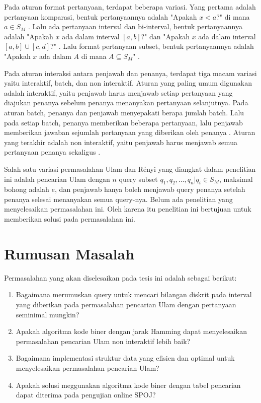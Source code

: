 Pada aturan format pertanyaan, terdapat beberapa variasi. Yang pertama adalah pertanyaan komparasi, bentuk pertanyaannya adalah "Apakah $x<a$?" di mana $a \in S_M$ \cite{Innes} \cite{Auletta1992}. Lalu ada pertanyaan interval dan bi-interval, bentuk pertanyaannya adalah "Apakah $x$ ada dalam interval $[a,b]$?" \cite{Peter2017} dan "Apakah $x$ ada dalam interval $[a,b] \cup [c,d]$?" \cite{Mundici1997}. Lalu format pertanyaan subset, bentuk pertanyaannya adalah "Apakah $x$ ada dalam $A$ di mana $A \subseteq S_M$" \cite{Katona} \cite{Macula1997}.

Pada aturan interaksi antara penjawab dan penanya, terdapat tiga macam variasi yaitu interaktif, batch, dan non interaktif. Aturan yang paling umum digunakan adalah interaktif, yaitu penjawab harus menjawab setiap pertanyaan yang diajukan penanya sebelum penanya menanyakan pertanyaan selanjutnya. Pada aturan batch, penanya dan penjawab menyepakati berapa jumlah batch. Lalu pada setiap batch, penanya memberikan beberapa pertanyaan, lalu penjawab memberikan jawaban sejumlah pertanyaan yang diberikan oleh penanya \cite{Cicalese2000}. Aturan yang terakhir adalah non interaktif, yaitu penjawab harus menjawab semua pertanyaan penanya sekaligus \cite{Macula1997}.

Salah satu variasi permasalahan Ulam dan Rényi yang diangkat dalam penelitian ini adalah pencarian Ulam dengan $n$ query subset ${q_1,q_2,\ldots,q_n} | q_i \in S_M$, maksimal bohong adalah $e$, dan penjawab hanya boleh menjawab query penanya setelah penanya selesai menanyakan semua query-nya. Belum ada penelitian yang menyelesaikan permasalahan ini. Oleh karena itu penelitian ini bertujuan untuk memberikan solusi pada permasalahan ini.


\section {Rumusan Masalah}
Permasalahan yang akan diselesaikan pada tesis ini adalah sebagai berikut:

\begin {enumerate}
  \item Bagaimana merumuskan query untuk mencari bilangan diskrit pada interval yang diberikan pada permasalahan pencarian Ulam dengan pertanyaan seminimal mungkin?
  \item Apakah algoritma kode biner dengan jarak Hamming dapat menyelesaikan permasalahan pencarian Ulam non interaktif lebih baik?
  \item Bagaimana implementasi struktur data yang efisien dan optimal untuk menyelesaikan permasalahan pencarian Ulam?
  \item Apakah solusi meggunakan algoritma kode biner dengan tabel pencarian dapat diterima pada pengujian online SPOJ?
\end {enumerate}



